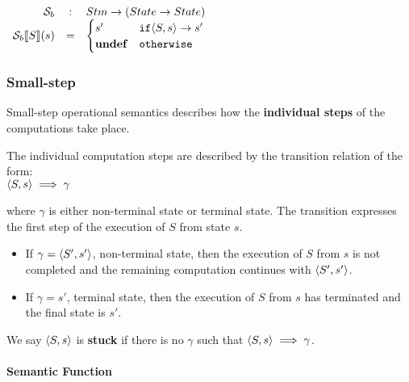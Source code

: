 \begin{math}
  \begin{array}{rcl}
    \mathcal{S}_b & : & Stm \to ( State \to State) \\
    \mathcal{S}_b \llbracket S \rrbracket (s) & = &
                                    \begin{cases}
                                      s' & \mathtt{if} \langle S, s \rangle \to s' \\
                                      \mathbf{undef} & \mathtt{otherwise}
                                    \end{cases}

  \end{array}
\end{math}


\subsubsection{Small-step}
\label{sec:small-step}

Small-step operational semantics describes how the \textbf{individual
  steps} of the computations take place.

The individual computation steps are described by the transition
relation of the form:
\\

\begin{math}
  \langle S, s \rangle \implies \gamma
\end{math}

where $\gamma$ is either non-terminal state or terminal state. The
transition expresses the first step of the execution of $S$ from state
$s$.

\begin{itemize}
\item If $ \gamma = \langle S', s' \rangle $, non-terminal state, then the
  execution of $S$ from $s$ is not completed and the remaining
  computation continues with $\langle S', s' \rangle$.
\item If $ \gamma = s'$, terminal state, then the execution of $S$
  from $s$ has terminated and the final state is $s'$.
\end{itemize}

We say $\langle S, s \rangle$ is \textbf{stuck} if there is no $\gamma$ such
that $\langle S, s \rangle \implies \gamma$.

\paragraph{Semantic Function}

